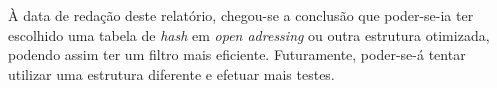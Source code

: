 À data de redação deste relatório, chegou-se a conclusão que poder-se-ia ter
escolhido uma tabela de \emph{hash} em \emph{open adressing} ou outra estrutura
otimizada, podendo assim ter um filtro mais eficiente. Futuramente, poder-se-á
tentar utilizar uma estrutura diferente e efetuar mais testes.


